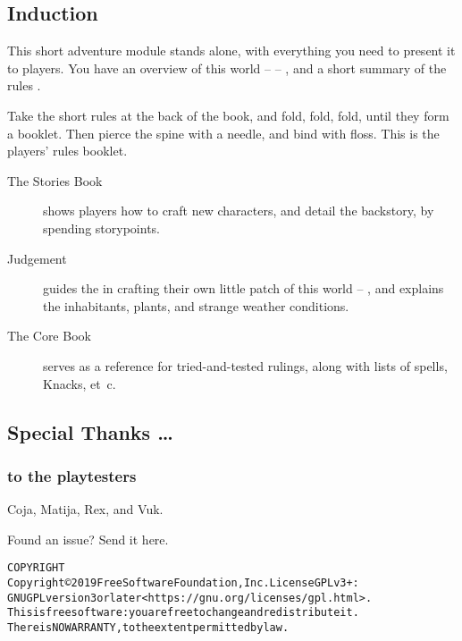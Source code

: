 \subsection*{Induction}

\begin{multicols}{2}
\noindent
This short adventure module stands alone, with everything you need to present it to players.
You have an overview of this world --  -- , and a short summary of the rules .

Take the short rules at the back of the book, and fold, fold, fold, until they form a booklet.
Then pierce the spine with a needle, and bind with floss.
This is the players' rules booklet.

\begin{description}
  \item[The Stories Book]
  shows players how to craft new characters, and detail the backstory, by spending \glspl{storypoint}.
  \item[Judgement]
  guides the  in crafting their own little patch of this world -- , and explains the inhabitants, plants, and strange weather conditions.
  \item[The Core Book]
  serves as a reference for tried-and-tested rulings, along with lists of spells, Knacks, et~c.
\end{description}

\subsection*{Special Thanks \ldots}
\subsubsection*{to the playtesters}
Coja, Matija, Rex, and Vuk.

\begin{center}
  
  Found an issue?
  Send it here.
\end{center}

\end{multicols}

\begin{alltt}
COPYRIGHT
       Copyright \copyright 2019 Free Software Foundation, Inc.  License GPLv3+:
  GNU GPL version 3 or later <https://gnu.org/licenses/gpl.html>.
       This is free software: you are free to change and redistribute it.
  There is NO WARRANTY, to the extent permitted by law.

\end{alltt}
